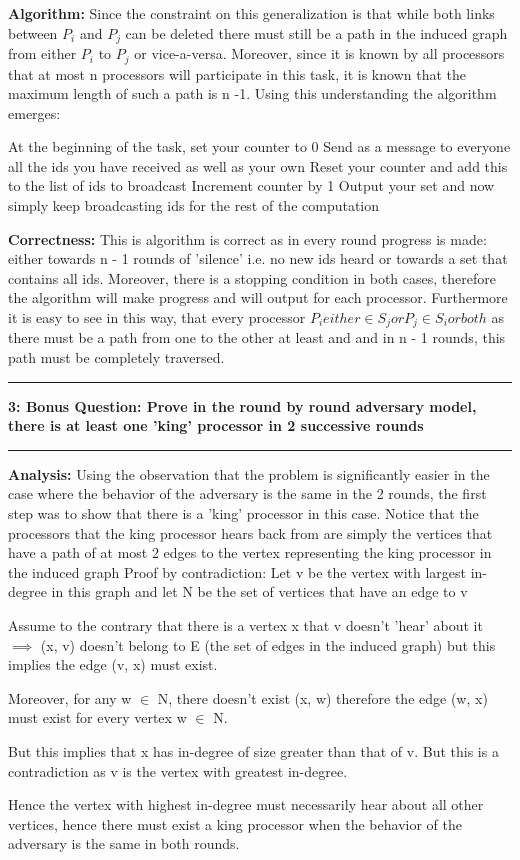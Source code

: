 \documentclass[11pt]{article}
\newcommand\question[2]{\vspace{.25in}\hrule\textbf{#1: #2}\vspace{.5em}\hrule\vspace{.10in}}
\newcommand\analysis{\vspace{.10in}\textbf{Analysis: }\newline}
\newcommand\algorithm{\vspace{.10in}\textbf{Algorithm: }}
\newcommand\correctness{\vspace{.10in}\textbf{Correctness: }\newline}
\begin{document}
\algorithm
Since the constraint on this generalization is that while both links between $P_{i}$ and $P_{j}$ can be deleted there must still be a path in the induced graph from either $P_{i}$ to $P_{j}$ or vice-a-versa. Moreover, since it is known by all processors that at most n processors will participate in this task, it is known that the maximum length of such a path is n -1. 
Using this understanding the algorithm emerges:
\begin{algorithmic}
\State At the beginning of the task, set your counter to 0
\State Send as a message to everyone all the ids you have received as well as your own
	Reset your counter and add this to the list of ids to broadcast
\Else
	Increment counter by 1
\EndIf
{}
	Output your set and now simply keep broadcasting ids for the rest of the computation
\EndIf
\EndFor
\end{algorithmic}

\correctness
This is algorithm is correct as in every round progress is made: either towards n - 1 rounds of 'silence' i.e. no new ids heard or towards a set that contains all ids. Moreover, there is a stopping condition in both cases, therefore the algorithm will make progress and will output for each processor. Furthermore it is easy to see in this way, that every processor $P_{i} either \in S_{j} or P_{j} \in S_{i} or both$ as there must be a path from one to the other at least and and in n - 1 rounds, this path must be completely traversed. 
\newpage

\question{3}{Bonus Question: Prove in the round by round adversary model, there is at least one 'king' processor in 2 successive rounds}

\analysis
Using the observation that the problem is significantly easier in the case where the behavior of the adversary is the same in the 2 rounds, the first step was to show that there is a 'king' processor in this case. 
Notice that the processors that the king processor hears back from are simply the vertices that have a path of at most 2 edges to the vertex representing the king processor in the induced graph
Proof by contradiction: \newline
Let v be the vertex with largest in-degree in this graph and let N be the set of vertices that have an edge to v

Assume to the contrary that there is a vertex x that v doesn't 'hear' about it $\implies$ (x, v) doesn't belong to E (the set of edges in the induced graph) but this implies the edge (v, x) must exist. 

Moreover, for any w $\in$ N, there doesn't exist (x, w) therefore the edge (w, x) must exist for every vertex w $\in$ N. 

But this implies that x has in-degree of size greater than that of v. But this is a contradiction as v is the vertex with greatest in-degree. 

Hence the vertex with highest in-degree must necessarily hear about all other vertices, hence there must exist a king processor when the behavior of the adversary is the same in both rounds. 
\end{document}
